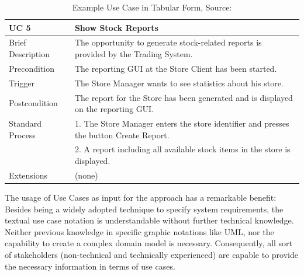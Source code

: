 \begin{table}[!h]
	\centering
	\begin{tabularx}{\textwidth}{|l||X|}
		\hline
	    UC 5 & Show Stock Reports \\ 
	    \hline
	    Brief Description &  The opportunity to generate stock-related reports is provided
	    by the Trading System. \\
	    \hline
	    Precondition & The reporting GUI at the Store Client has been started. \\
	    \hline
	    Trigger & The Store Manager wants to see statistics about his store. \\
	    \hline
	    Postcondition & The report for the Store has been generated and is displayed on
	    the reporting GUI. \\
	    \hline 
	    Standard Process &
	       
	            1. The Store Manager enters the store identifier and presses the button Create
	                     Report.  \\
	           & 2. A report including all available stock items in the store is displayed. \\  
        \hline
        Extensions & (none) \\ \hline
	   
		
	\end{tabularx}
	\caption{Example Use Case in Tabular Form, Source: \cite{CoCoMEOld}}
	\label{tab:exampleUseCase}
	
\end{table}

\noindent
The usage of Use Cases as input for the approach has a remarkable benefit: Besides being a widely adopted technique to specify system requirements, the textual use case notation is understandable without further technical knowledge. Neither previous knowledge in specific graphic notations like UML, nor the capability to create a complex domain model is necessary. Consequently, all sort of stakeholders (non-technical and technically experienced) are capable to provide the necessary information in terms of use cases. 





